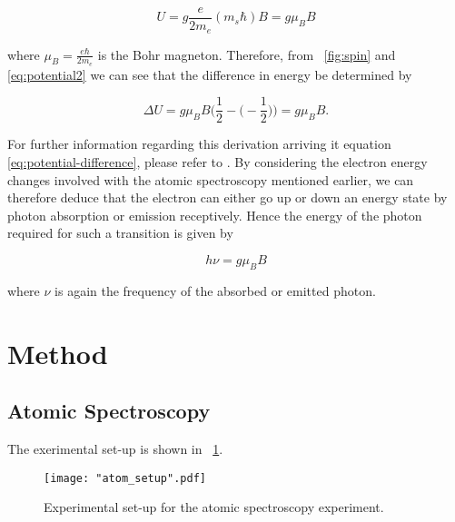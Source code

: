 \documentclass{article}
\newcommand{\figref}[2][\figurename~]{#1\ref{#2}}
\begin{document}

\begin{equation}
\label{eq:potential2}
U = g\frac{e}{2m_e}(m_s\hbar)B = g\mu_BB
\end{equation}

\vspace{2mm}
\noindent
where $\mu_B = \frac{e\hbar}{2m_e}$ is the Bohr magneton. Therefore, from \figref{fig:spin} and \eqref{eq:potential2} we can see that the difference in energy be determined by \cite{Paper02}

\begin{equation}
\label{eq:potential-difference}
\Delta U = g\mu_BB\Big(\frac{1}{2} - \Big(-\frac{1}{2}\Big)\Big) = g\mu_BB.
\end{equation}

\vspace{2mm}
\noindent
For further information regarding this derivation arriving it equation \eqref{eq:potential-difference}, please refer to \cite{Book01}. By considering the electron energy changes involved with the atomic spectroscopy mentioned earlier, we can therefore deduce that the electron can either go up or down an energy state by photon absorption or emission receptively. Hence the energy of the photon required for such a transition is given by

\begin{equation}
\label{eq:frequency-equation}
h\nu = g\mu_BB
\end{equation}

\vspace{2mm}
\noindent
where $\nu$ is again the frequency of the absorbed or emitted photon. 

\newpage
\section{Method}
\label{sec:method}

\subsection{Atomic Spectroscopy}
\label{ssec:atomic-method}
The exerimental set-up is shown in \figref{fig:atom_picture}. 

\begin{figure}[h]
\centering
\texttt{[image: "atom\_setup".pdf]}
\caption{Experimental set-up for the atomic spectroscopy experiment.}
\label{fig:atom_picture}
\end{figure}
\end{document}
